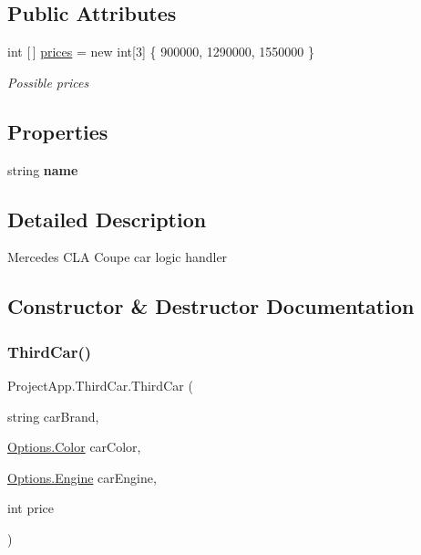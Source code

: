 \subsection*{Public Attributes}
\begin{DoxyCompactItemize}
\item 
int \mbox{[}$\,$\mbox{]} \mbox{\hyperlink{class_project_app_1_1_third_car_a0735e725ed6e06d584e9784bb3e57882}{prices}} = new int\mbox{[}3\mbox{]} \{ 900000, 1290000, 1550000 \}
\begin{DoxyCompactList}\small\item\em Possible prices \end{DoxyCompactList}\end{DoxyCompactItemize}
\subsection*{Properties}
\begin{DoxyCompactItemize}
\item 
\mbox{\label{class_project_app_1_1_third_car_a0e7c2093fb26727400ef72c495987a40}} 
string {\bfseries name}
\end{DoxyCompactItemize}


\subsection{Detailed Description}
Mercedes C\+LA Coupe car logic handler 



\subsection{Constructor \& Destructor Documentation}
\mbox{\label{class_project_app_1_1_third_car_a89b0b9c635e4e52de95ac9366b885bb6}} 
\subsubsection{\texorpdfstring{Third\+Car()}{ThirdCar()}\hspace{0.1cm}{\footnotesize\ttfamily [1/2]}}
{\footnotesize\ttfamily Project\+App.\+Third\+Car.\+Third\+Car (\begin{DoxyParamCaption}\item[{string}]{car\+Brand,  }\item[{\mbox{\hyperlink{class_project_app_1_1_options_aaa68b08af20deeebf73e6bc6de725c44}{Options.\+Color}}}]{car\+Color,  }\item[{\mbox{\hyperlink{class_project_app_1_1_options_a95e313182e8122da719f7c8caefcc88d}{Options.\+Engine}}}]{car\+Engine,  }\item[{int}]{price }\end{DoxyParamCaption})}



